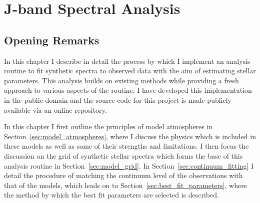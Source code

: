 


% 
\chapter{J-band Spectral Analysis}\label{ch:janal}

\section{Opening Remarks} %
\label{sec:opening}

In this chapter I describe in detail the process by which I implement an analysis
routine to fit synthetic spectra to observed data with the aim of estimating stellar parameters.
This analysis builds on existing methods while providing a fresh approach to various aspects of the routine.
I have developed this implementation in the public domain and the source code for this project is made publicly available
via an online repository.\footnotemark


In this chapter I first outline the principles of model atmospheres in Section~\ref{sec:model_atmospheres}, where I discuss the physics which is included in these models as well as some of their strengths and limitations.
I then focus the discussion on the grid of synthetic stellar spectra which forms the base of this analysis routine in Section~\ref{sec:model_grid}.
In Section~\ref{sec:continuum_fitting} I detail the procedure of matching the continuum level of the observations with that of the models,
which leads on to Section~\ref{sec:best_fit_parameters}, where the method by which the best fit parameters are selected is described.

